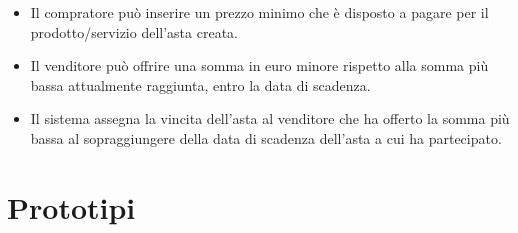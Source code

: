\begin{itemize}
\begin{itemize}
                \item Il compratore può inserire un prezzo minimo che è disposto a pagare per il prodotto/servizio dell'asta creata.
                \item Il venditore può offrire una somma in euro minore rispetto alla somma più bassa attualmente raggiunta, entro la data di scadenza.
                \item Il sistema assegna la vincita dell'asta al venditore che ha offerto la somma più bassa al sopraggiungere della data di scadenza dell'asta a cui ha partecipato.
            \end{itemize}
        \end{itemize}

     \section{Prototipi}